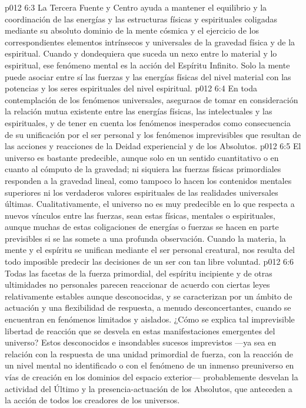 \vs p012 6:3 La Tercera Fuente y Centro ayuda a mantener el equilibrio y la coordinación de las energías y las estructuras físicas y espirituales coligadas mediante su absoluto dominio de la mente cósmica y el ejercicio de los correspondientes elementos intrínsecos y universales de la gravedad física y de la espiritual. Cuando y dondequiera que suceda un nexo entre lo material y lo espiritual, ese fenómeno mental es la acción del Espíritu Infinito. Solo la mente puede asociar entre sí las fuerzas y las energías físicas del nivel material con las potencias y los seres espirituales del nivel espiritual.
\vs p012 6:4 En toda contemplación de los fenómenos universales, aseguraos de tomar en consideración la relación mutua existente entre las energías físicas, las intelectuales y las espirituales, y de tener en cuenta los fenómenos inesperados como consecuencia de su unificación por el ser personal y los fenómenos imprevisibles que resultan de las acciones y reacciones de la Deidad experiencial y de los Absolutos.
\vs p012 6:5 El universo es bastante predecible, aunque solo en un sentido cuantitativo o en cuanto al cómputo de la gravedad; ni siquiera las fuerzas físicas primordiales responden a la gravedad lineal, como tampoco lo hacen los contenidos mentales superiores ni los verdaderos valores espirituales de las realidades universales últimas. Cualitativamente, el universo no es muy predecible en lo que respecta a nuevos vínculos entre las fuerzas, sean estas físicas, mentales o espirituales, aunque muchas de estas coligaciones de energías o fuerzas se hacen en parte previsibles si se las somete a una profunda observación. Cuando la materia, la mente y el espíritu se unifican mediante el ser personal creatural, nos resulta del todo imposible predecir las decisiones de un ser con tan libre voluntad.
\vs p012 6:6 \pc Todas las facetas de la fuerza primordial, del espíritu incipiente y de otras ultimidades no personales parecen reaccionar de acuerdo con ciertas leyes relativamente estables aunque desconocidas, y se caracterizan por un ámbito de actuación y una flexibilidad de respuesta, a menudo desconcertantes, cuando se encuentran en fenómenos limitados y aislados. ¿Cómo se explica tal imprevisible libertad de reacción que se desvela en estas manifestaciones emergentes del universo? Estos desconocidos e insondables sucesos imprevistos ---ya sea en relación con la respuesta de una unidad primordial de fuerza, con la reacción de un nivel mental no identificado o con el fenómeno de un inmenso preuniverso en vías de creación en los dominios del espacio exterior--- probablemente desvelan la actividad del Último y la presencia\hyp{}actuación de los Absolutos, que anteceden a la acción de todos los creadores de los universos.
